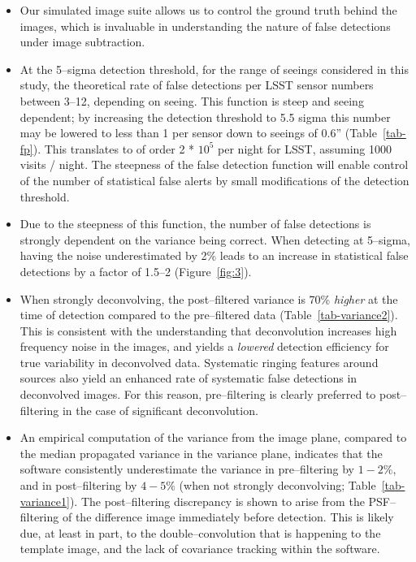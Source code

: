 \documentclass[iop]{emulateapj}
\begin{document}
\begin{itemize}


\item Our simulated image suite allows us to control the ground truth behind the images, which is invaluable in understanding the nature of false detections under image subtraction.

\item At the 5--sigma detection threshold, for the range of seeings considered in this study, the theoretical rate of false detections per LSST sensor numbers between 3--12, depending on seeing.
  This function is steep and seeing dependent; by increasing the detection threshold to 5.5 sigma this number may be lowered to less than 1 per sensor down to seeings of 0.6'' (Table~\ref{tab-fp}).
  This translates to of order 2 * $10^5$ per night for LSST, assuming 1000 visits / night.
  The steepness of the false detection function will enable control of the number of statistical false alerts by small modifications of the detection threshold.

\item Due to the steepness of this function, the number of false detections is strongly dependent on the variance being correct.
  When detecting at 5--sigma, having the noise underestimated by 2\% leads to an increase in statistical false detections by a factor of 1.5--2 (Figure~\ref{fig:3}).

\item When strongly deconvolving, the post--filtered variance is 70\% {\it higher} at the time of detection compared to the pre--filtered data (Table~\ref{tab-variance2}).
  This is consistent with the understanding that deconvolution increases high frequency noise in the images, and yields a {\it lowered} detection efficiency for true variability in deconvolved data.
  Systematic ringing features around sources also yield an enhanced rate of systematic false detections in deconvolved images.
  For this reason, pre--filtering is clearly preferred to post--filtering in the case of significant deconvolution.


\item An empirical computation of the variance from the image plane, compared to the median propagated variance in the variance plane, indicates that the software consistently underestimate the variance in pre--filtering by $1-2\%$, and in post--filtering by $4-5\%$ (when not strongly deconvolving; Table~\ref{tab-variance1}).
  The post--filtering discrepancy is shown to arise from the PSF--filtering of the difference image immediately before detection.
  This is likely due, at least in part, to the double--convolution that is happening to the template image, and the lack of covariance tracking within the software.


\end{itemize}
\end{document}
